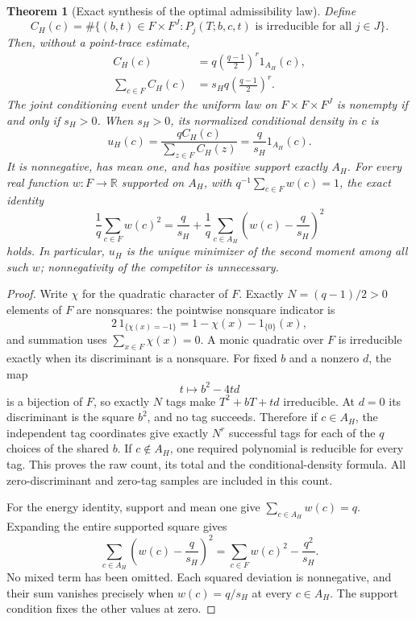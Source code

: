 \documentclass[11pt]{article}
\newtheorem{theorem}{Theorem}[section]
\begin{document}
\begin{theorem}[Exact synthesis of the optimal admissibility law]
\label{thm:constellationFlatLaw}
Define
\[
 C_H(c)=\#\{(b,t)\in F\times F^J:
                     P_j(T;b,c,t)\text{ is irreducible for all }j\in J\}.
\]
Then, without a point-trace estimate,
\begin{align}
 C_H(c)&=q\left(\frac{q-1}{2}\right)^r1_{A_H}(c),\\
 \sum_{c\in F}C_H(c)&=s_Hq\left(\frac{q-1}{2}\right)^r.
\end{align}
The joint conditioning event under the uniform law on
\(F\times F\times F^J\) is nonempty if and only if \(s_H>0\).
When \(s_H>0\), its normalized conditional density in \(c\) is
\[
 u_H(c)=\frac{qC_H(c)}{\sum_{z\in F}C_H(z)}
                   =\frac{q}{s_H}1_{A_H}(c).
\]
It is nonnegative, has mean one, and has positive support exactly
\(A_H\). For every real function \(w:F\to\mathbb R\) supported on
\(A_H\), with \(q^{-1}\sum_{c\in F}w(c)=1\), the exact identity
\[
 \frac1q\sum_{c\in F}w(c)^2
   =\frac{q}{s_H}
       +\frac1q\sum_{c\in A_H}\left(w(c)-\frac{q}{s_H}\right)^2
\]
holds. In particular, \(u_H\) is the unique minimizer of the second
moment among all such \(w\); nonnegativity of the competitor is unnecessary.
\end{theorem}

\begin{proof}
Write \(\chi\) for the quadratic character of \(F\).
Exactly \(N=(q-1)/2>0\) elements of \(F\) are nonsquares:
the pointwise nonsquare indicator is
\[
             2\,1_{\{\chi(x)=-1\}}=1-\chi(x)-1_{\{0\}}(x),
\]
and summation uses \(\sum_{x\in F}\chi(x)=0\).
A monic quadratic over \(F\) is irreducible exactly when its
discriminant is a nonsquare.
For fixed \(b\) and a nonzero \(d\), the map
\[
                         t\longmapsto b^2-4td
\]
is a bijection of \(F\), so exactly \(N\) tags make
\(T^2+bT+td\) irreducible. At \(d=0\) its discriminant is the square
\(b^2\), and no tag succeeds. Therefore if \(c\in A_H\), the independent
tag coordinates give exactly \(N^r\) successful tags for each of
the \(q\) choices of the shared \(b\). If \(c\notin A_H\), one required
polynomial is reducible for every tag. This proves the raw count,
its total and the conditional-density formula. All zero-discriminant
and zero-tag samples are included in this count.

For the energy identity, support and mean one give
\(\sum_{c\in A_H}w(c)=q\). Expanding the entire supported square gives
\[
 \sum_{c\in A_H}\left(w(c)-\frac q{s_H}\right)^2
       =\sum_{c\in F}w(c)^2-\frac{q^2}{s_H}.
\]
No mixed term has been omitted. Each squared deviation is nonnegative,
and their sum vanishes precisely when \(w(c)=q/s_H\) at every
\(c\in A_H\). The support condition fixes the other values at zero.
\end{proof}
\end{document}

